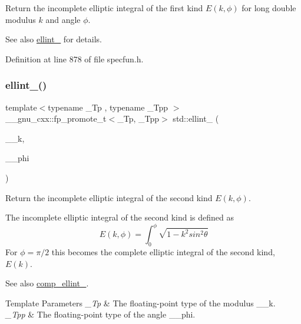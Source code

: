 Return the incomplete elliptic integral of the first kind $ E(k,\phi) $ for {\ttfamily long double} modulus $ k $ and angle $ \phi $.

\begin{DoxySeeAlso}{See also}
\hyperlink{group__tr29124__math__spec__func_ga1550d6947bbbeee9865aabd398102a36}{ellint\+\_} for details. 
\end{DoxySeeAlso}


Definition at line 878 of file specfun.\+h.

\mbox{\label{group__tr29124__math__spec__func_gad64cb9babb7837d585912b1a94b2cb7d}} 
\subsubsection{\texorpdfstring{ellint\+\_()}{ellint\_2()}}
{\footnotesize\ttfamily template$<$typename \+\_\+\+Tp , typename \+\_\+\+Tpp $>$ \\
\+\_\+\+\_\+gnu\+\_\+cxx\+::fp\+\_\+promote\+\_\+t$<$\+\_\+\+Tp, \+\_\+\+Tpp$>$ std\+::ellint\+\_ (\begin{DoxyParamCaption}\item[{\+\_\+\+Tp}]{\+\_\+\+\_\+k,  }\item[{\+\_\+\+Tpp}]{\+\_\+\+\_\+phi }\end{DoxyParamCaption})\hspace{0.3cm}{\ttfamily [inline]}}

Return the incomplete elliptic integral of the second kind $ E(k,\phi) $.

The incomplete elliptic integral of the second kind is defined as \[ E(k,\phi) = \int_0^{\phi} \sqrt{1 - k^2 sin^2\theta} \] For $ \phi= \pi/2 $ this becomes the complete elliptic integral of the second kind, $ E(k) $. \begin{DoxySeeAlso}{See also}
\hyperlink{group__tr29124__math__spec__func_gaadf288465eea84ec609d93de96200aaa}{comp\+\_\+ellint\+\_}.
\end{DoxySeeAlso}

\begin{DoxyTemplParams}{Template Parameters}
{\em \+\_\+\+Tp} & The floating-\/point type of the modulus {\ttfamily \+\_\+\+\_\+k}. \\
\hline
{\em \+\_\+\+Tpp} & The floating-\/point type of the angle {\ttfamily \+\_\+\+\_\+phi}. \\
\hline
\end{DoxyTemplParams}

